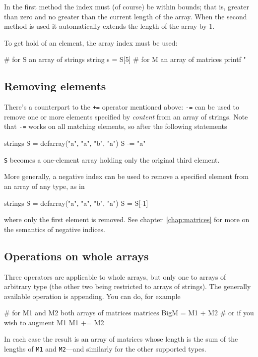 In the first method the index must (of course) be within bounds; that
is, greater than zero and no greater than the current length of the
array. When the second method is used it automatically extends the
length of the array by 1.

To get hold of an element, the array index must be used:
\begin{code}
# for S an array of strings
string s = S[5]
# for M an array of matrices
printf "\n%
\end{code}

\subsection{Removing elements}

There's a counterpart to the \texttt{+=} operator mentioned above:
\texttt{-=} can be used to remove one or more elements specified by
\textit{content} from an array of strings. Note that \texttt{-=} works
on all matching elements, so after the following statements
\begin{code}
strings S = defarray("a", "a", "b", "a")
S -= "a"
\end{code}
\texttt{S} becomes a one-element array holding only the original third
element.

More generally, a negative index can be used to remove a specified
element from an array of any type, as in
\begin{code}
strings S = defarray("a", "a", "b", "a")
S = S[-1]
\end{code}
where only the first element is removed. See
chapter~\ref{chap:matrices} for more on the semantics of negative
indices.

\subsection{Operations on whole arrays}

Three operators are applicable to whole arrays, but only one to
arrays of arbitrary type (the other two being restricted to arrays of
strings). The generally available operation is appending. You can do,
for example
\begin{code}
# for M1 and M2 both arrays of matrices
matrices BigM = M1 + M2
# or if you wish to augment M1
M1 += M2
\end{code}
In each case the result is an array of matrices whose length is the sum
of the lengths of \texttt{M1} and \texttt{M2}---and similarly for the
other supported types.

